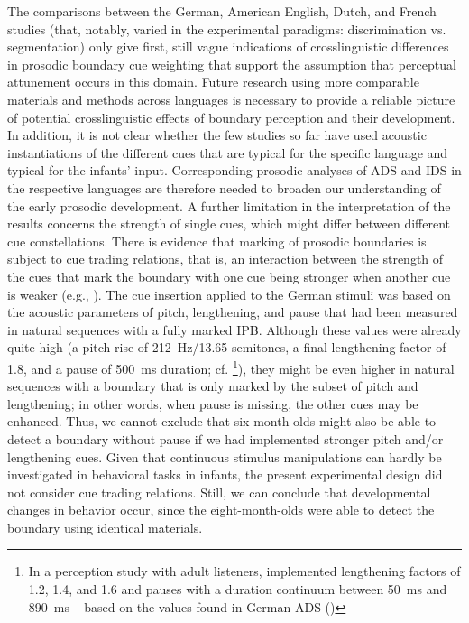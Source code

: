 \documentclass[output=paper]{langscibook}
\begin{document}
The comparisons between the German, American English, Dutch, and French studies (that, notably, varied in the experimental paradigms: discrimination vs. segmentation) only give first, still vague indications of crosslinguistic differences in prosodic boundary cue weighting that support the assumption that perceptual attunement occurs in this domain. Future research using more comparable materials and methods across languages is necessary to provide a reliable picture of potential crosslinguistic effects of boundary perception and their development. In addition, it is not clear whether the few studies so far have used acoustic instantiations of the different cues that are typical for the specific language and typical for the infants’ input. Corresponding prosodic analyses of ADS and IDS in the respective languages are therefore needed to broaden our understanding of the early prosodic development. A further limitation in the interpretation of the results concerns the strength of single cues, which might differ between different cue constellations. There is evidence that marking of prosodic boundaries is subject to cue trading relations, that is, an interaction between the strength of the cues that mark the boundary with one cue being stronger when another cue is weaker (e.g., \citealt{Beach1991}). The cue insertion applied to the German stimuli was based on the acoustic parameters of pitch, lengthening, and pause that had been measured in natural sequences with a fully marked IPB. Although these values were already quite high (a pitch rise of \qty{212}{\hertz}/13.65 semitones, a final lengthening factor of 1.8, and a pause of \qty{500}{\ms} duration; cf. \citet{Peters2005a}\footnote{In a perception study with adult listeners, \citet{Peters2005a} implemented lengthening factors of 1.2, 1.4, and 1.6 and pauses with a duration continuum between \qty{50}{\ms} and \qty{890}{\ms} -- based on the values found in German ADS (\citealt{Peters2005PhonetMerk})}), they might be even higher in natural sequences with a boundary that is only marked by the subset of pitch and lengthening; in other words, when pause is missing, the other cues may be enhanced. Thus, we cannot exclude that six-month-olds might also be able to detect a boundary without pause if we had implemented stronger pitch and/or lengthening cues. Given that continuous stimulus manipulations can hardly be investigated in behavioral tasks in infants, the present experimental design did not consider cue trading relations. Still, we can conclude that developmental changes in behavior occur, since the eight-month-olds were able to detect the boundary using identical materials.
\end{document}
